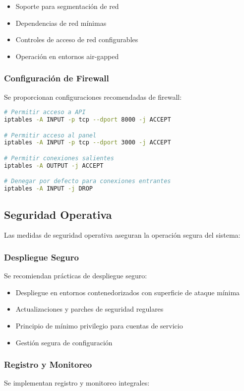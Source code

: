 \begin{itemize}
    \item Soporte para segmentación de red
    \item Dependencias de red mínimas
    \item Controles de acceso de red configurables
    \item Operación en entornos air-gapped
\end{itemize}

\subsubsection{Configuración de Firewall}
Se proporcionan configuraciones recomendadas de firewall:

\begin{lstlisting}[language=bash, caption=Ejemplo de Configuración de Firewall]
# Permitir acceso a API
iptables -A INPUT -p tcp --dport 8000 -j ACCEPT

# Permitir acceso al panel
iptables -A INPUT -p tcp --dport 3000 -j ACCEPT

# Permitir conexiones salientes
iptables -A OUTPUT -j ACCEPT

# Denegar por defecto para conexiones entrantes
iptables -A INPUT -j DROP
\end{lstlisting}

\subsection{Seguridad Operativa}
Las medidas de seguridad operativa aseguran la operación segura del sistema:

\subsubsection{Despliegue Seguro}
Se recomiendan prácticas de despliegue seguro:

\begin{itemize}
    \item Despliegue en entornos contenedorizados con superficie de ataque mínima
    \item Actualizaciones y parches de seguridad regulares
    \item Principio de mínimo privilegio para cuentas de servicio
    \item Gestión segura de configuración
\end{itemize}

\subsubsection{Registro y Monitoreo}
Se implementan registro y monitoreo integrales:


